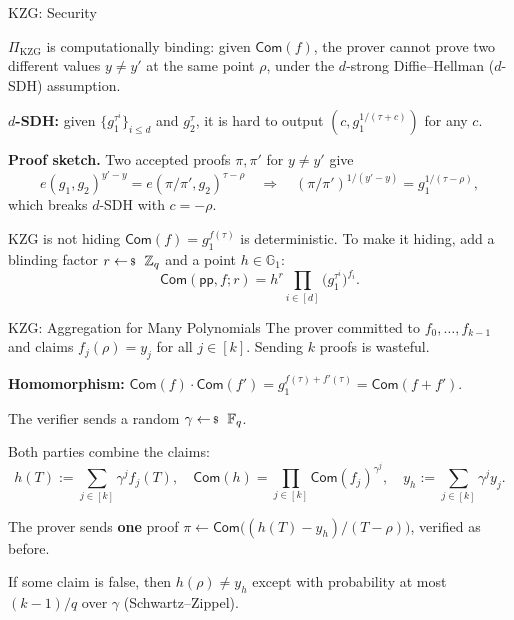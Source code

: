 \documentclass{zkdl-presentation-template}
\begin{document}
    \begin{frame}{KZG: Security}
        \small
        \begin{lemma}[informal]
            $\Pi_{\text{KZG}}$ is computationally binding: given $\mathsf{Com}(f)$, the prover cannot prove two different values $y \neq y'$ at the same point $\rho$, under the $d$-strong Diffie--Hellman ($d$-SDH) assumption.
        \end{lemma}
        \textbf{$d$-SDH:} given $\{g_1^{\tau^i}\}_{i \leq d}$ and $g_2^{\tau}$, it is hard to output $(c, g_1^{1/(\tau + c)})$ for any $c$.
        \pause

        \textbf{Proof sketch.} Two accepted proofs $\pi, \pi'$ for $y \neq y'$ give
        \begin{equation*}
            e(g_1, g_2)^{y' - y} = e(\pi/\pi', g_2)^{\tau - \rho} \quad \Longrightarrow \quad (\pi/\pi')^{1/(y' - y)} = g_1^{1/(\tau - \rho)},
        \end{equation*}
        which breaks $d$-SDH with $c = -\rho$.
        \pause

        \begin{alertblock}{KZG is not hiding}
            $\mathsf{Com}(f) = g_1^{f(\tau)}$ is deterministic. To make it hiding, add a blinding factor $r \leftarrowS \mathbb{Z}_q$ and a point $h \in \mathbb{G}_1$:
            \begin{equation*}
                \mathsf{Com}(\mathsf{pp}, f; r) = h^r \prod_{i \in [d]} \big(g_1^{\tau^i}\big)^{f_i}.
            \end{equation*}
        \end{alertblock}
    \end{frame}

    \begin{frame}{KZG: Aggregation for Many Polynomials}
        \small
        The prover committed to $f_0, \dots, f_{k-1}$ and claims $f_j(\rho) = y_j$ for all $j \in [k]$.
        Sending $k$ proofs is wasteful.
        \pause

        \textbf{Homomorphism:} $\mathsf{Com}(f)\cdot\mathsf{Com}(f') = g_1^{f(\tau) + f'(\tau)} = \mathsf{Com}(f + f')$.
        \pause

        \begin{algoen}
            \item The verifier sends a random $\gamma \leftarrowS \F_q$.\pause
            \item Both parties combine the claims:
            \begin{equation*}
                h(T) := \sum_{j \in [k]} \gamma^j f_j(T), \quad \mathsf{Com}(h) = \prod_{j \in [k]} \mathsf{Com}(f_j)^{\gamma^j}, \quad y_h := \sum_{j \in [k]} \gamma^j y_j.
            \end{equation*}\pause
            \item The prover sends \textbf{one} proof $\pi \gets \mathsf{Com}\big((h(T) - y_h)/(T - \rho)\big)$, verified as before.
        \end{algoen}
        \pause

        If some claim is false, then $h(\rho) \neq y_h$ except with probability at most $(k-1)/q$ over $\gamma$ (Schwartz--Zippel).
    \end{frame}
\end{document}
